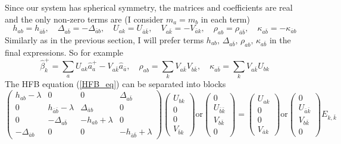 \documentclass[10pt,a4paper]{article}
\begin{document}
Since our system has spherical symmetry, the matrices and coefficients are real and the only non-zero terms are (I consider $m_a = m_b$ in each term)
\begin{equation}
h_{ab} = h_{\bar{a}\bar{b}},\quad \Delta_{a\bar{b}} = -\Delta_{\bar{a}b},\quad
U_{ak} = U_{\bar{a}\bar{k}},\quad V_{a\bar{k}} = -V_{\bar{a}k},\quad
\rho_{ab} = \rho_{\bar{a}\bar{b}},\quad \kappa_{a\bar{b}} = -\kappa_{\bar{a}b}
\end{equation}
Similarly as in the previous section, I will prefer terms $h_{ab},\,\Delta_{a\bar{b}},\,\rho_{ab},\,\kappa_{a\bar{b}}$ in the final expressions. So for example
\begin{equation}
\hat{\beta}_k^+ = \sum_a U_{ak}\hat{a}_a^+ - V_{a\bar{k}}\hat{a}_{\bar{a}},\quad
\rho_{ab} = \sum_k V_{a\bar{k}}V_{b\bar{k}},\quad
\kappa_{a\bar{b}} = \sum_k V_{a\bar{k}} U_{bk}
\end{equation}
The HFB equation (\ref{HFB_eq}) can be separated into blocks
\begin{equation}
\begin{pmatrix} h_{ab}-\lambda & 0 & 0 & \Delta_{a\bar{b}} \\
0 & h_{\bar{a}\bar{b}}-\lambda & \Delta_{\bar{a}b} & 0 \\
0 & -\Delta_{a\bar{b}} & -h_{ab}+\lambda & 0 \\
-\Delta_{\bar{a}b} & 0 & 0 & -h_{\bar{a}\bar{b}}+\lambda \end{pmatrix}
\begin{pmatrix} U_{bk} \\ 0 \\ 0 \\ V_{\bar{b}k} \end{pmatrix} \textrm{or}
\begin{pmatrix} 0 \\ U_{\bar{b}\bar{k}} \\ V_{b\bar{k}} \\ 0 \end{pmatrix} =
\begin{pmatrix} U_{ak} \\ 0 \\ 0 \\ V_{\bar{a}k} \end{pmatrix} \textrm{or}
\begin{pmatrix} 0 \\ U_{\bar{a}\bar{k}} \\ V_{b\bar{k}} \\ 0 \end{pmatrix}
E_{k,\bar{k}}
\end{equation}
\end{document}
